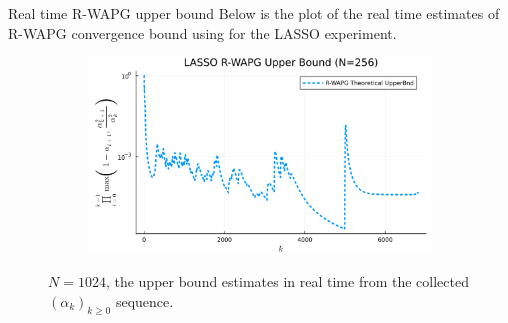 \documentclass[11pt]{beamer}
\theoremstyle{definition}
\begin{document}
        \begin{frame}{Real time R-WAPG upper bound}
            Below is the plot of the real time estimates of R-WAPG convergence bound using for the LASSO experiment. 
            \begin{figure}[H]
                \centering
                \begin{subfigure}[b]{0.75\textwidth}
                    \centering
                    \includegraphics[width=\textwidth]{
                        assets/lasso_rwapg_upperbnd_256.png
                    }
                \end{subfigure}
                \caption{
                    $N = 1024$, the upper bound estimates in real time from the collected $(\alpha_k)_{k \ge 0}$ sequence. 
                }
                \label{fig:single-lass-r-wapg-rwapg-upperbnd}
            \end{figure}
        \end{frame}
\end{document}
